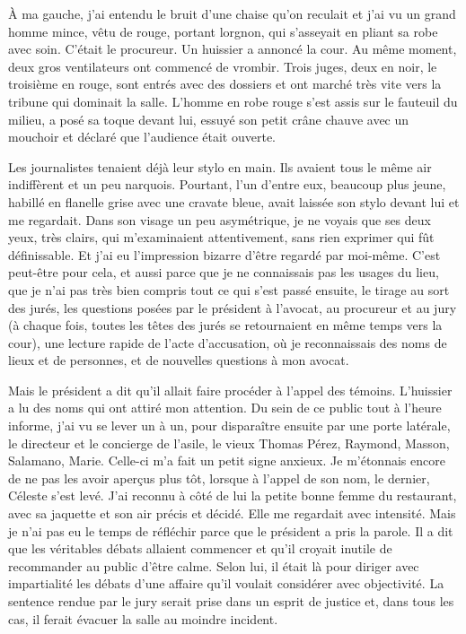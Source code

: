 \documentclass[french,twoside]{book} %
\begin{document}
À ma gauche, j’ai entendu le bruit d’une chaise qu’on reculait et j’ai vu un grand homme mince, vêtu de rouge, portant lorgnon, qui s’asseyait en pliant sa robe avec soin. C'était le procureur. Un huissier a annoncé la cour. Au même moment, deux gros ventilateurs ont commencé de vrombir. Trois juges, deux en noir, le troisième en rouge, sont entrés avec des dossiers et ont marché très vite vers la tribune qui dominait la salle. L'homme en robe rouge s’est assis sur le fauteuil du milieu, a posé sa toque devant lui, essuyé son petit crâne chauve avec un mouchoir et déclaré que l’audience était ouverte.\par
Les journalistes tenaient déjà leur stylo en main. Ils avaient tous le même air indiffèrent et un peu narquois. Pourtant, l’un d’entre eux, beaucoup plus jeune, habillé en flanelle grise avec une cravate bleue, avait laissée son stylo devant lui et me regardait. Dans son visage un peu asymétrique, je ne voyais que ses deux yeux, très clairs, qui m’examinaient attentivement, sans rien exprimer qui fût définissable. Et j’ai eu l’impression bizarre d’être regardé par moi-même. C'est peut-être pour cela, et aussi parce que je ne connaissais pas les usages du lieu, que je n’ai pas très bien compris tout ce qui s’est passé ensuite, le tirage au sort des jurés, les questions posées par le président à l’avocat, au procureur et au jury (à chaque fois, toutes les têtes des jurés se retournaient en même temps vers la cour), une lecture rapide de l’acte d’accusation, où je reconnaissais des noms de lieux et de personnes, et de nouvelles questions à mon avocat.\par
Mais le président a dit qu’il allait faire procéder à l’appel des témoins. L'huissier a lu des noms qui ont attiré mon attention. Du sein de ce public tout à l’heure informe, j’ai vu se lever un à un, pour disparaître ensuite par une porte latérale, le directeur et le concierge de l’asile, le vieux Thomas Pérez, Raymond, Masson, Salamano, Marie. Celle-ci m’a fait un petit signe anxieux. Je m’étonnais encore de ne pas les avoir aperçus plus tôt, lorsque à l’appel de son nom, le dernier, Céleste s’est levé. J'ai reconnu à côté de lui la petite bonne femme du restaurant, avec sa jaquette et son air précis et décidé. Elle me regardait avec intensité. Mais je n’ai pas eu le temps de réfléchir parce que le président a pris la parole. Il a dit que les véritables débats allaient commencer et qu’il croyait inutile de recommander au public d’être calme. Selon lui, il était là pour diriger avec impartialité les débats d’une affaire qu’il voulait considérer avec objectivité. La sentence rendue par le jury serait prise dans un esprit de justice et, dans tous les cas, il ferait évacuer la salle au moindre incident.\par
\end{document}
